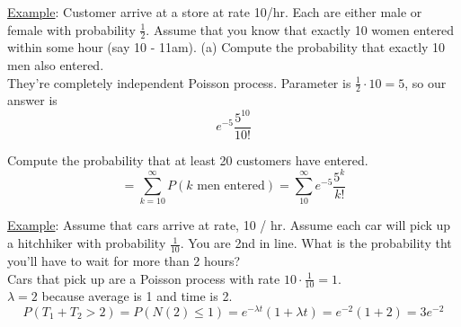     \noindent\underline{Example}: Customer arrive at a store at rate 10/hr.
      Each are either male or female with probability $\frac{1}{2}$. Assume that
      you know that exactly 10 women entered within some hour (say 10 - 11am).
      (a) Compute the probability that exactly 10 men also entered.\\

    \noindent They're completely independent Poisson process. Parameter is
      $\frac{1}{2} \cdot  10 = 5$, so our answer is
      $$
        e^{-5} \frac{5^{10}}{10!}
      $$

    \noindent Compute the probability that at least 20 customers have entered.\\

    $$
      = \sum_{k = 10}^{\infty} P(\text{$k$ men entered}) = \sum_{10}^{\infty}
        e^{-5} \frac{5^k}{k!}
    $$

    \noindent \underline{Example}: Assume that cars arrive at rate, 10 / hr. 
      Assume each car will pick up a hitchhiker with probability $\frac{1}{10}$.
      You are 2nd in line. What is the probability tht you'll have to wait for 
      more than 2 hours?\\

    \noindent Cars that pick up are a Poisson process with rate $10 \cdot 
      \frac{1}{10} = 1$.\\
      $\lambda = 2$ because average is 1 and time is 2.
      $$
        P(T_1 + T_2 > 2) = P(N(2) \le 1) = e^{-\lambda t} (1 + \lambda t) = e^{-2}(1 + 2) = 3e^{-2}
      $$
